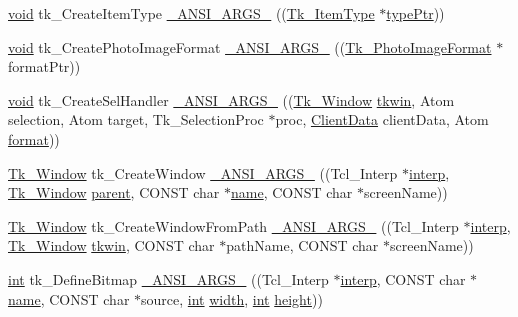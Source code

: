 \begin{DoxyCompactItemize}
\item 
\hyperlink{tk_8h_aba408b7cd755a96426e004c015f5de8e}{void} tk\+\_\+\+Create\+Item\+Type \hyperlink{struct_tk_stubs_aa02570d8edd283f5a7259e7f30755344}{\+\_\+\+A\+N\+S\+I\+\_\+\+A\+R\+G\+S\+\_\+} ((\hyperlink{struct_tk___item_type}{Tk\+\_\+\+Item\+Type} $\ast$\hyperlink{tk_8h_aa93ff76198031a582cbff2fad6d80ca6}{type\+Ptr}))
\item 
\hyperlink{tk_8h_aba408b7cd755a96426e004c015f5de8e}{void} tk\+\_\+\+Create\+Photo\+Image\+Format \hyperlink{struct_tk_stubs_aa854e33647ab57c45b4a50090318ca99}{\+\_\+\+A\+N\+S\+I\+\_\+\+A\+R\+G\+S\+\_\+} ((\hyperlink{struct_tk___photo_image_format}{Tk\+\_\+\+Photo\+Image\+Format} $\ast$format\+Ptr))
\item 
\hyperlink{tk_8h_aba408b7cd755a96426e004c015f5de8e}{void} tk\+\_\+\+Create\+Sel\+Handler \hyperlink{struct_tk_stubs_a45ffe68a658101c114f9e6f24776859f}{\+\_\+\+A\+N\+S\+I\+\_\+\+A\+R\+G\+S\+\_\+} ((\hyperlink{tk_8h_ab756137de3ee74edc2501bd0d761e37c}{Tk\+\_\+\+Window} \hyperlink{tk_8h_a35df722e7e1b6efd651683b8be7c1490}{tkwin}, Atom selection, Atom target, Tk\+\_\+\+Selection\+Proc $\ast$proc, \hyperlink{tk_8h_accf84b4d725a8f41e04d6333768a6001}{Client\+Data} client\+Data, Atom \hyperlink{tk_8h_a0ba71cf135249ea84ec2787d3eab31b2}{format}))
\item 
\hyperlink{tk_8h_ab756137de3ee74edc2501bd0d761e37c}{Tk\+\_\+\+Window} tk\+\_\+\+Create\+Window \hyperlink{struct_tk_stubs_a6f4cd8a554283502ecd13b9103d1f226}{\+\_\+\+A\+N\+S\+I\+\_\+\+A\+R\+G\+S\+\_\+} ((Tcl\+\_\+\+Interp $\ast$\hyperlink{tk_8h_a5ab79c0f5849ee8e6a2e955a6c536cc0}{interp}, \hyperlink{tk_8h_ab756137de3ee74edc2501bd0d761e37c}{Tk\+\_\+\+Window} \hyperlink{tk_8h_a5bd0fe2ecadcfa6c142914cb359aea47}{parent}, C\+O\+N\+ST char $\ast$\hyperlink{tk_8h_a2946c588fc7fa2fa5b43ac54b7872725}{name}, C\+O\+N\+ST char $\ast$screen\+Name))
\item 
\hyperlink{tk_8h_ab756137de3ee74edc2501bd0d761e37c}{Tk\+\_\+\+Window} tk\+\_\+\+Create\+Window\+From\+Path \hyperlink{struct_tk_stubs_ab1be5c40e8ff8e1db9587c06d0f2a509}{\+\_\+\+A\+N\+S\+I\+\_\+\+A\+R\+G\+S\+\_\+} ((Tcl\+\_\+\+Interp $\ast$\hyperlink{tk_8h_a5ab79c0f5849ee8e6a2e955a6c536cc0}{interp}, \hyperlink{tk_8h_ab756137de3ee74edc2501bd0d761e37c}{Tk\+\_\+\+Window} \hyperlink{tk_8h_a35df722e7e1b6efd651683b8be7c1490}{tkwin}, C\+O\+N\+ST char $\ast$path\+Name, C\+O\+N\+ST char $\ast$screen\+Name))
\item 
\hyperlink{tk_8h_a83f82f76e7fed06f4c49d2db94028a6d}{int} tk\+\_\+\+Define\+Bitmap \hyperlink{struct_tk_stubs_ae877f058c0ea610c40a88902d5bed208}{\+\_\+\+A\+N\+S\+I\+\_\+\+A\+R\+G\+S\+\_\+} ((Tcl\+\_\+\+Interp $\ast$\hyperlink{tk_8h_a5ab79c0f5849ee8e6a2e955a6c536cc0}{interp}, C\+O\+N\+ST char $\ast$\hyperlink{tk_8h_a2946c588fc7fa2fa5b43ac54b7872725}{name}, C\+O\+N\+ST char $\ast$source, \hyperlink{tk_8h_a83f82f76e7fed06f4c49d2db94028a6d}{int} \hyperlink{tk_8h_a29e50a5401c1396b3a2aa3487f74d468}{width}, \hyperlink{tk_8h_a83f82f76e7fed06f4c49d2db94028a6d}{int} \hyperlink{tk_8h_a67be2f4b9d9c5b3559139bfb072e2e81}{height}))

\end{DoxyCompactItemize}
